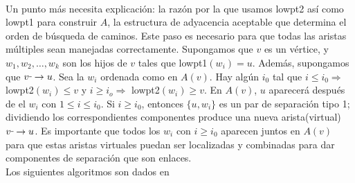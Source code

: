\paragraph{}
Un punto más necesita explicación: la razón por la que usamos lowpt2 así como lowpt1 para construir $A$, la estructura de adyacencia aceptable que determina el orden de búsqueda de caminos. Este paso es necesario para que todas las aristas múltiples sean manejadas correctamente. Supongamos que $v$ es un vértice, y $w_{1}, w_{2}, \ldots, w_{k}$ son los hijos de $v$ tales que lowpt1$(w_{i}) = u$. Además, supongamos que $v \rule[1mm]{.1cm}{0.4pt} \rightarrow u$. Sea la $w_{i}$ ordenada como en $A\left(v\right)$. Hay algún $i_{0}$ tal que $i \leq i_{0 } \Rightarrow$ lowpt2$\left(w_{i}\right) \le v$ y $i \ge i_{o} \Rightarrow$ lowpt2$\left(w_{i}\right) \geq v$. En $A\left(v\right)$, $u$ aparecerá después de el $w_{i}$ con $1 \leq i \leq i_{0}$. Si $i \ge i_{0}$, entonces $\{u, w_{i}\}$ es un par de separación tipo 1; dividiendo los correspondientes componentes produce una nueva arista(virtual) $v \rule[1mm]{.1cm}{0.4pt} \rightarrow u$. Es importante que todos los $w_{i}$ con $i \ge i_{0}$ aparecen juntos en $A\left(v\right)$ para que estas aristas virtuales puedan ser localizadas y combinadas para dar componentes de separación que son enlaces.\\
Los siguientes algoritmos son dados en \citep{Gutwenger2000ALT}\\


